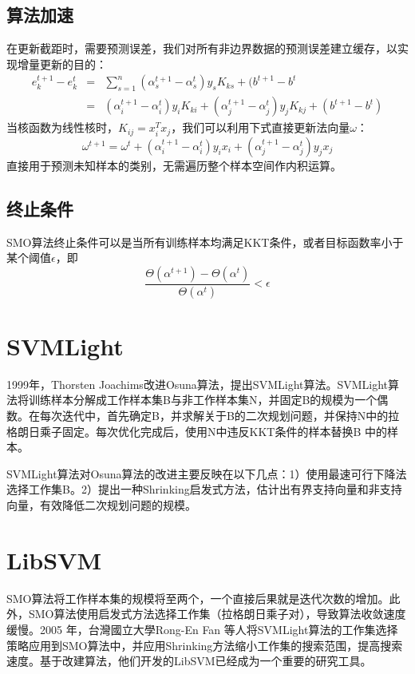 \subsection{算法加速}
在更新截距时，需要预测误差，我们对所有非边界数据的预测误差建立缓存，以实现增量更新的目的：
\begin{equation}
    \begin{array}{lll}
        e_k^{t+1} - e_k^t & = & \sum\limits_{s=1}^n (\alpha_s^{t+1} - \alpha_s^t) y_s K_{ks} + (b^{t+1} - b^t \\
         & = & (\alpha_i^{t+1} - \alpha_i^t) y_i K_{ki} + (\alpha_j^{t+1} - \alpha_j^t) y_j K_{kj} + (b^{t+1} - b^t)
    \end{array}
\end{equation}
当核函数为线性核时，$K_{ij} = x_i^T x_j$，我们可以利用下式直接更新法向量$\omega$：
\begin{equation}
    \omega^{t+1} = \omega^t + (\alpha_i^{t+1} - \alpha_i^t) y_i x_i + (\alpha_j^{t+1} - \alpha_j^t) y_j x_j
\end{equation}
直接用于预测未知样本的类别，无需遍历整个样本空间作内积运算。

\subsection{终止条件}
SMO算法终止条件可以是当所有训练样本均满足KKT条件，或者目标函数率小于某个阈值$\epsilon$，即
\begin{equation}
    \frac{\Theta(\alpha^{t+1}) - \Theta(\alpha^t)}{\Theta(\alpha^t)} < \epsilon
\end{equation}

\section{SVMLight}
1999年，Thorsten Joachims\cite{joachims1999making,joachims2002learning}改进Osuna算法，提出SVMLight算法。SVMLight算法将训练样本分解成工作样本集B与非工作样本集N，并固定B的规模为一个偶数。在每次迭代中，首先确定B，并求解关于B的二次规划问题，并保持N中的拉格朗日乘子固定。每次优化完成后，使用N中违反KKT条件的样本替换B 中的样本。

SVMLight算法对Osuna算法的改进主要反映在以下几点：1）使用最速可行下降法选择工作集B。2）提出一种Shrinking启发式方法，估计出有界支持向量和非支持向量，有效降低二次规划问题的规模。

\section{LibSVM}
SMO算法将工作样本集的规模将至两个，一个直接后果就是迭代次数的增加。此外，SMO算法使用启发式方法选择工作集（拉格朗日乘子对），导致算法收敛速度缓慢。2005 年，台灣國立大學Rong-En Fan 等人\cite{fan2005working}将SVMLight算法的工作集选择策略应用到SMO算法中，并应用Shrinking方法缩小工作集的搜索范围，提高搜索速度。基于改建算法，他们开发的LibSVM\cite{fan2008liblinear,chang2011libsvm}已经成为一个重要的研究工具。

